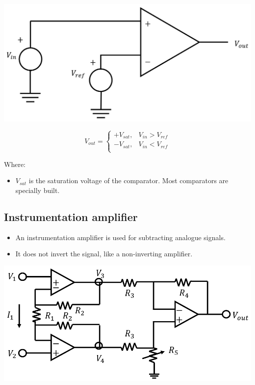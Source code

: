 \documentclass[11pt]{article}
\begin{document}
\begin{center}
\includegraphics[width=.9\linewidth]{./images/comparator-circuit.png}
\end{center}

\begin{displaymath}
V_{out} = \begin{cases}
+V_{sat}, & V_{in} > V_{ref} \\
-V_{sat}, & V_{in} < V_{ref} \\
\end{cases}
\end{displaymath}

Where:
\begin{itemize}
\item \(V_{sat}\) is the saturation voltage of the comparator. Most comparators are specially built.
\end{itemize}

 \newpage
\subsection{Instrumentation amplifier}
\label{sec:org6ddb4f7}
\begin{itemize}
\item An instrumentation amplifier is used for subtracting analogue signals.
\item It does not invert the signal, like a non-inverting amplifier.
\end{itemize}

\begin{center}
\includegraphics[width=.9\linewidth]{./images/instrumentation-amplifier-circuit.png}
\end{center}
\end{document}
